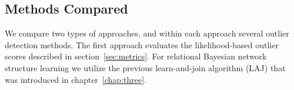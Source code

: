 								\subsection{Methods Compared}
								\label{sec:methods}
								We compare two types of approaches, and within each approach several outlier detection methods. The first approach evaluates the likelihood-based outlier scores described in section~\ref{sec:metrics}. For relational Bayesian network structure learning we utilize the previous learn-and-join algorithm (LAJ) that was introduced in chapter~\ref{chap:three}.
								
								
